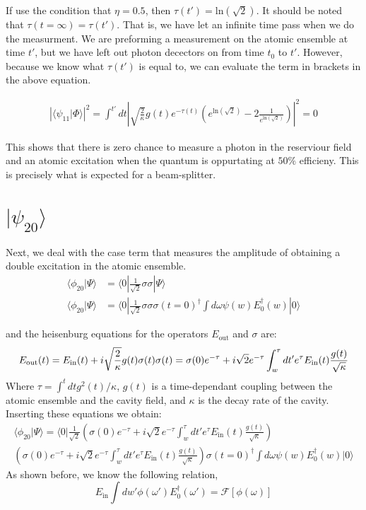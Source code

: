 \documentclass[12pt]{article}
\begin{document}
If use the condition that $\eta=0.5$, then $\tau(t') = \textrm{ln}(\sqrt{2})$. It should be noted that $\tau(t=\infty) = \tau(t')$. That is, we have let an infinite time pass when we do the measurment. We are preforming a measurement on the atomic ensemble at time $t'$, but we have left out photon decectors on from time $t_0$ to $t'$. However, because we know what $\tau(t')$ is equal to, we can evaluate the term in brackets in the above equation.

\begin{align}
\left | \langle \psi_{11} | \Phi \rangle \right | ^2 = \int^{t'} dt \left| \sqrt{\frac{2}{\kappa}} g(t) e^{-\tau(t)} \left ( e^{\textrm{ln}(\sqrt{2})} -2 \frac{1}{e^{\textrm{ln}({\sqrt{2}})}} \right ) \right|^2 = 0 
\end{align}

This shows that there is zero chance to measure a photon in the reserviour field and an atomic excitation when the quantum is oppurtating at $50\%$ efficieny. This is precisely what is expected for a beam-splitter.


\section{ $| \psi_{20} \rangle$}
Next, we deal with the case term that measures the amplitude of obtaining a double excitation in the atomic ensemble.
\begin{align}
\langle \phi_{20}| \Psi \rangle &=\langle 0 |\frac{1}{\sqrt{2}} \sigma \sigma | \Psi \rangle\\
\langle \phi_{20}| \Psi \rangle &=\langle 0 | \frac{1}{\sqrt{2}} \sigma \sigma 
\sigma(t=0)^\dagger \int d\omega \psi(w) E_0^\dagger(w) | 0 \rangle
\end{align}

and the heisenburg equations for the operators $E_\textrm{out}$ and $\sigma$ are:
\begin{equation}
E_\textrm{out}(t) = E_\textrm{in}(t) + i \sqrt{\frac{2}{\kappa}} g(t) \sigma(t) \\
\sigma(t) = \sigma(0) e^{-\tau} + i\sqrt{2} e^{-\tau} \int^\tau_w d t' e^\tau E_\textrm{in}(t) \frac{g(t)}{\sqrt{\kappa}}
\end{equation}
Where $\tau = \int^t dt g^2(t)/\kappa$, $g(t)$ is a time-dependant coupling between the atomic ensemble and the cavity field, and $\kappa$ is the decay rate of the cavity. Inserting these equations we obtain:
\begin{multline}
\langle \phi_{20}| \Psi \rangle =\langle 0 | \frac{1}{\sqrt{2}} \left (  \sigma(0) e^{-\tau} + i\sqrt{2} e^{-\tau} \int^\tau_w d t' e^\tau E_\textrm{in}(t) \frac{g(t)}{\sqrt{\kappa}} \right )\\ \left ( \sigma(0) e^{-\tau} + i\sqrt{2} e^{-\tau} \int^\tau_w d t' e^\tau E_\textrm{in}(t) \frac{g(t)}{\sqrt{\kappa}} \right ) \sigma(t=0)^\dagger \int d\omega \psi(w) E_0^\dagger(w) | 0 \rangle
\end{multline}
As shown before, we know the following relation,
\begin{equation}
E_\textrm{in} \int dw' \phi(\omega') E_0^\dagger(\omega') = \mathscr{F}[\phi(\omega)]
\end{equation}
\end{document}
